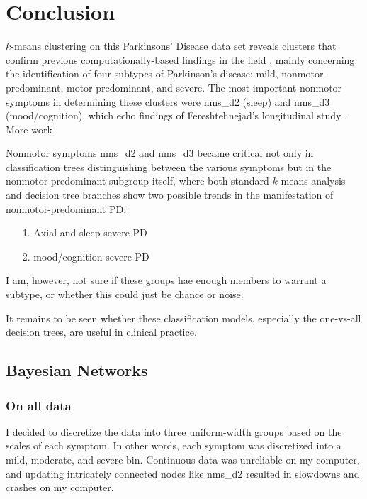 \documentclass[letterpaper,12pt]{article}
\begin{document}
\section{Conclusion}

$k$-means clustering on this Parkinsons' Disease data set reveals clusters that
confirm previous computationally-based findings in the field
\cite{vanrooden10}, mainly concerning the identification of four subtypes of
Parkinson's disease: mild, nonmotor-predominant, motor-predominant, and severe.
The most important nonmotor symptoms in determining these clusters were nms\_d2
(sleep) and nms\_d3 (mood/cognition), which echo findings of Fereshtehnejad's
longitudinal study \cite{fereshtehnejad15}. More work

Nonmotor symptoms nms\_d2 and nms\_d3 became critical not only in
classification trees distinguishing between the various symptoms but in the
nonmotor-predominant subgroup itself, where both standard $k$-means analysis
and decision tree branches show two possible trends in the
manifestation of nonmotor-predominant PD:

\begin{itemize}
  \item[1.] Axial and sleep-severe PD
  \item[2.] mood/cognition-severe PD
\end{itemize}

I am, however, not sure if these groups hae enough members to warrant a
subtype, or whether this could just be chance or noise.

It remains to be seen whether these classification models, especially the
one-vs-all decision trees, are useful in clinical practice.

\subsection{Bayesian Networks}

\subsubsection{On all data}

I decided to discretize the data into three uniform-width groups based on the
scales of each symptom. In other words, each symptom was discretized into a
mild, moderate, and severe bin. Continuous data was unreliable on my computer,
and updating intricately connected nodes like nms\_d2 resulted in slowdowns and
crashes on my computer.
\end{document}
